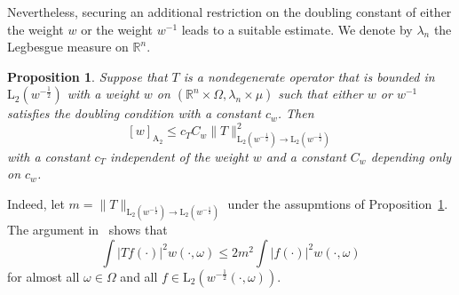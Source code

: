 \documentclass[12pt]{amsart}
\newtheorem {proposition} [theorem] {Proposition}
\newcommand {\apclass} [1] {\ensuremath{\mathrm A_{#1}}}
\newcommand {\lclass} [2] {\ensuremath{\mathrm L_{#1} \left( #2 \right) }}
\newcommand {\weightw} {\ensuremath {\mathit w}}
\begin{document}
Nevertheless, securing an additional restriction on the doubling constant of
either the weight $\weightw$ or the weight $\weightw^{-1}$ leads to a suitable estimate.
We denote by $\lambda_n$ the Legbesgue measure on $\mathbb R^n$.
\begin {proposition}
\label {nondegwd}
Suppose that $T$ is a nondegenerate operator that is bounded in $\lclass {2} {\weightw^{-\frac 1 2}}$
with a weight $\weightw$ on $(\mathbb R^n \times \Omega, \lambda_n \times \mu)$
such that either $\weightw$ or $\weightw^{-1}$ satisfies the doubling condition with a constant $c_{\weightw}$.
Then
\begin {equation}
\label {nondegwdeq}
[\weightw]_{\apclass {2}} \leqslant c_T C_{\weightw} \|T\|_{\lclass {2} {\weightw^{-\frac 1 2}} \to \lclass {2} {\weightw^{-\frac 1 2}}}^2
\end {equation}
with a constant $c_T$ independent of the weight $\weightw$ and a constant $C_\weightw$ depending only on $c_\weightw$.
\end {proposition}
Indeed, let $m = \|T\|_{\lclass {2} {\weightw^{-\frac 1 2}} \to \lclass {2} {\weightw^{-\frac 1 2}}}$ under the assupmtions of
Proposition~\ref {nondegwd}.
The argument in~\cite [Proposition~19] {rutsky2011en} shows that
\begin {equation}
\label {singnd}
\int |T f (\cdot)|^2 \weightw (\cdot, \omega) \leqslant 2 m^2 \int |f (\cdot)|^2 \weightw (\cdot, \omega)
\end {equation}
for almost all $\omega \in \Omega$ and all $f \in \lclass {2} {\weightw^{-\frac 1 2} (\cdot, \omega)}$.
\end{document}
